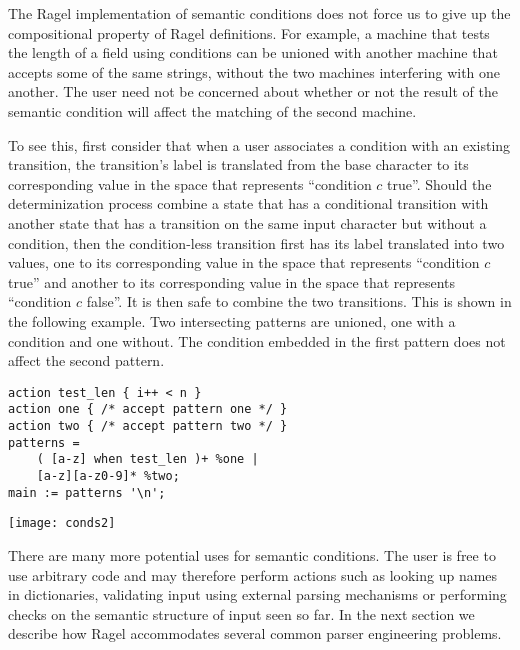 \documentclass[letterpaper,11pt,oneside]{book}
\newcommand{\graphspace}{\vspace{10pt}}
\newenvironment{inline_code}{\def\baselinestretch{1}\vspace{12pt}\small}{}
\begin{document}
The Ragel implementation of semantic conditions does not force us to give up the
compositional property of Ragel definitions. For example, a machine that tests
the length of a field using conditions can be unioned with another machine
that accepts some of the same strings, without the two machines interfering with
one another. The user need not be concerned about whether or not the result of the
semantic condition will affect the matching of the second machine.

To see this, first consider that when a user associates a condition with an
existing transition, the transition's label is translated from the base character
to its corresponding value in the space that represents ``condition $c$ true''. Should
the determinization process combine a state that has a conditional transition
with another state that has a transition on the same input character but
without a condition, then the condition-less transition first has its label
translated into two values, one to its corresponding value in the space that
represents ``condition $c$ true'' and another to its corresponding value in the
space that represents ``condition $c$ false''. It
is then safe to combine the two transitions. This is shown in the following
example.  Two intersecting patterns are unioned, one with a condition and one
without. The condition embedded in the first pattern does not affect the second
pattern.

\begin{inline_code}
\begin{verbatim}
action test_len { i++ < n }
action one { /* accept pattern one */ }
action two { /* accept pattern two */ }
patterns = 
    ( [a-z] when test_len )+ %one |
    [a-z][a-z0-9]* %two;
main := patterns '\n';
\end{verbatim}
\end{inline_code}

\begin{center}
\texttt{[image: conds2]}
\end{center}
\graphspace

There are many more potential uses for semantic conditions. The user is free to
use arbitrary code and may therefore perform actions such as looking up names
in dictionaries, validating input using external parsing mechanisms or
performing checks on the semantic structure of input seen so far. In the
next section we describe how Ragel accommodates several common parser
engineering problems.
\end{document}
